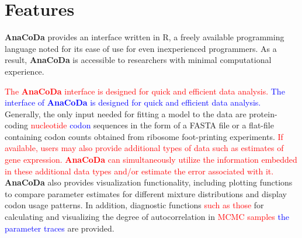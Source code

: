 \documentclass{bioinfo}
\newcommand{\package}{\textbf{AnaCoDa}\xspace} %
\begin{document}
\section*{Features}
\package provides an interface written in R, a freely available programming language noted for its ease of use for even inexperienced programmers. 
As a result, \package is accessible to researchers with minimal computational experience. 

\textcolor{red}{The \package interface is designed for quick and efficient data analysis.}
\textcolor{blue}{The interface of \package is designed for quick and efficient data analysis.}
Generally, the only input needed for fitting a model to the data are protein-coding \textcolor{red}{nucleotide} \textcolor{blue}{codon} sequences in the form of a FASTA file or a flat-file containing codon counts obtained from ribosome foot-printing experiments. 
\textcolor{red}
{
If available, users may also provide additional types of data such as estimates of gene expression.
\package can simultaneously utilize the information embedded in these additional data types and/or estimate the error associated with it.
}
\package also provides visualization functionality, including plotting functions to compare parameter estimates for different mixture distributions and display codon usage patterns. 
In addition, diagnostic functions \textcolor{red}{such as those} for calculating and visualizing the degree of autocorrelation in \textcolor{red}{MCMC samples} \textcolor{blue}{the parameter traces} are provided.

\end{document}

